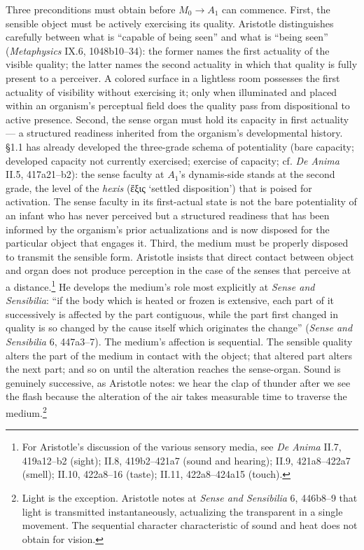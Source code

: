 \documentclass{article}
\newcommand{\gk}[1]{{\greekfont #1}}
\begin{document}
Three preconditions must obtain before $M_0 \rightarrow A_1$ can commence. First, the sensible object must be actively exercising its quality. Aristotle distinguishes carefully between what is ``capable of being seen'' and what is ``being seen'' (\textit{Metaphysics} IX.6, 1048b10--34): the former names the first actuality of the visible quality; the latter names the second actuality in which that quality is fully present to a perceiver. A colored surface in a lightless room possesses the first actuality of visibility without exercising it; only when illuminated and placed within an organism's perceptual field does the quality pass from dispositional to active presence. Second, the sense organ must hold its capacity in first actuality --- a structured readiness inherited from the organism's developmental history. §1.1 has already developed the three-grade schema of potentiality (bare capacity; developed capacity not currently exercised; exercise of capacity; cf. \textit{De Anima} II.5, 417a21--b2): the sense faculty at $A_1$'s dynamis-side stands at the second grade, the level of the \textit{hexis} (\gk{ἕξις} `settled disposition') that is poised for activation. The sense faculty in its first-actual state is not the bare potentiality of an infant who has never perceived but a structured readiness that has been informed by the organism's prior actualizations and is now disposed for the particular object that engages it. Third, the medium must be properly disposed to transmit the sensible form. Aristotle insists that direct contact between object and organ does not produce perception in the case of the senses that perceive at a distance.\footnote{For Aristotle's discussion of the various sensory media, see \textit{De Anima} II.7, 419a12--b2 (sight); II.8, 419b2--421a7 (sound and hearing); II.9, 421a8--422a7 (smell); II.10, 422a8--16 (taste); II.11, 422a8--424a15 (touch).} He develops the medium's role most explicitly at \textit{Sense and Sensibilia}: ``if the body which is heated or frozen is extensive, each part of it successively is affected by the part contiguous, while the part first changed in quality is so changed by the cause itself which originates the change'' (\textit{Sense and Sensibilia} 6, 447a3--7). The medium's affection is sequential. The sensible quality alters the part of the medium in contact with the object; that altered part alters the next part; and so on until the alteration reaches the sense-organ. Sound is genuinely successive, as Aristotle notes: we hear the clap of thunder after we see the flash because the alteration of the air takes measurable time to traverse the medium.\footnote{Light is the exception. Aristotle notes at \textit{Sense and Sensibilia} 6, 446b8--9 that light is transmitted instantaneously, actualizing the transparent in a single movement. The sequential character characteristic of sound and heat does not obtain for vision.}
\end{document}

